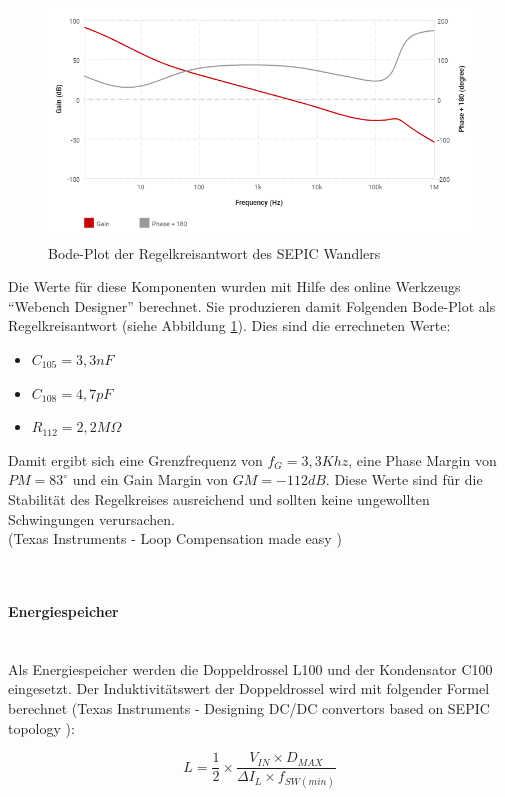 \begin{figure}[H]
    \centering
    \includegraphics[width=1\textwidth]{resources/images/bode.png}
    \caption[Bode-Plot]{Bode-Plot der Regelkreisantwort des SEPIC Wandlers}
    \label{fig:bode}
\end{figure}

Die Werte für diese Komponenten wurden mit Hilfe des online Werkzeugs \enquote{Webench Designer} berechnet. Sie produzieren damit
Folgenden Bode-Plot als Regelkreisantwort (siehe Abbildung \ref{fig:bode}). Dies sind die errechneten Werte:
\begin{itemize}
    \item \(C_{105} = 3,3nF\)
    \item \(C_{108} = 4,7pF\)
    \item \(R_{112} = 2,2M\Omega\)
\end{itemize}
Damit ergibt sich eine Grenzfrequenz von \(f_{G} = 3,3Khz\), eine Phase Margin von \(PM = 83^\circ\) und ein Gain Margin
von \(GM = - 112dB\). Diese Werte sind für die Stabilität des Regelkreises ausreichend und sollten keine ungewollten Schwingungen
verursachen. \\
(Texas Instruments - Loop Compensation made easy \cite{comp})

\

\paragraph{Energiespeicher}\mbox{}\\
Als Energiespeicher werden die Doppeldrossel L100 und der Kondensator C100 eingesetzt. Der Induktivitätswert der Doppeldrossel
wird mit folgender Formel berechnet (Texas Instruments - Designing DC/DC convertors based on SEPIC topology \cite{sepic}):

\[L = \frac{1}{2} \times \frac{V_{IN} \times D_{MAX}}{\Delta I_L \times f_{SW(min)}}\]

